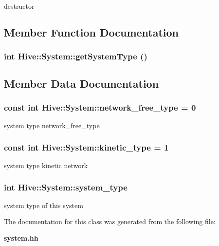 destructor 



\subsection{Member Function Documentation}
\subsubsection[getSystemType]{\setlength{\rightskip}{0pt plus 5cm}int Hive::System::getSystemType ()}\label{classHive_1_1System_009aae3c55c070dfc610010b94a1cc08}




\subsection{Member Data Documentation}
\subsubsection[network\_\-free\_\-type]{\setlength{\rightskip}{0pt plus 5cm}const int {\bf Hive::System::network\_\-free\_\-type} = 0\hspace{0.3cm}{\tt  [static]}}\label{classHive_1_1System_e8fcbcff761ee7459101621d92e07928}


system type network\_\-free\_\-type 

\subsubsection[kinetic\_\-type]{\setlength{\rightskip}{0pt plus 5cm}const int {\bf Hive::System::kinetic\_\-type} = 1\hspace{0.3cm}{\tt  [static]}}\label{classHive_1_1System_e792ebbacd05e3f5cc1dfa725e7cb0b7}


system type kinetic network 

\subsubsection[system\_\-type]{\setlength{\rightskip}{0pt plus 5cm}int {\bf Hive::System::system\_\-type}\hspace{0.3cm}{\tt  [protected]}}\label{classHive_1_1System_203a63d9870f21f74dfe53a73bd797c4}


system type of this system 



The documentation for this class was generated from the following file:\begin{CompactItemize}
\item 
{\bf system.hh}\end{CompactItemize}
